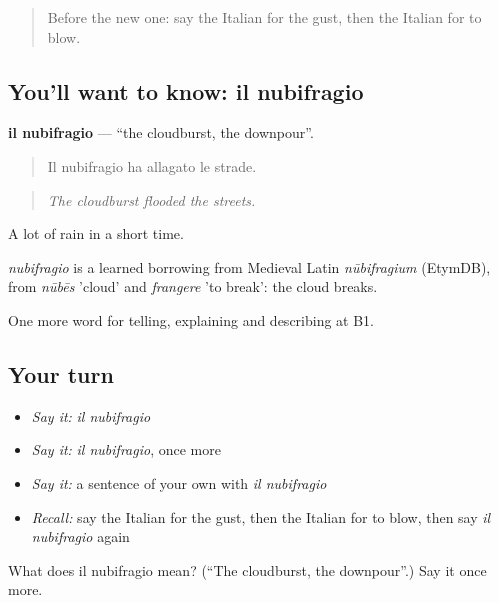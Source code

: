 \label{lesson:IT-C469-nubifragio}



\begin{quote}
Before the new one: say the Italian for the gust, then the Italian for to blow.
\end{quote}

\subsection*{You'll want to know: il nubifragio}
\textbf{il nubifragio} — \textquotedblleft{}the cloudburst, the downpour\textquotedblright{}.

\begin{quote}
Il nubifragio ha allagato le strade.
\end{quote}

\begin{quote}
\emph{The cloudburst flooded the streets.}
\end{quote}

A lot of rain in a short time.

\begin{cousinweb}
\emph{nubifragio} is a learned borrowing from Medieval Latin \emph{nūbifragium} (EtymDB), from \emph{nūbēs} 'cloud' and \emph{frangere} 'to break': the cloud breaks.
\end{cousinweb}

\begin{grammarlens}[title={What you've built}]
One more word for telling, explaining and describing at B1.
\end{grammarlens}

\subsection*{Your turn}
\begin{itemize}
\raggedright
  \item \emph{Say it:} \emph{il nubifragio}
  \item \emph{Say it:} \emph{il nubifragio}, once more
  \item \emph{Say it:} a sentence of your own with \emph{il nubifragio}
  \item \emph{Recall:} say the Italian for the gust, then the Italian for to blow, then say \emph{il nubifragio} again
\end{itemize}

\begin{tcolorbox}[breakable,colback=teal!4,colframe=teal!35!black,title={Before you move on}]
What does il nubifragio mean? (\textquotedblleft{}The cloudburst, the downpour\textquotedblright{}.) Say it once more.
\end{tcolorbox}
